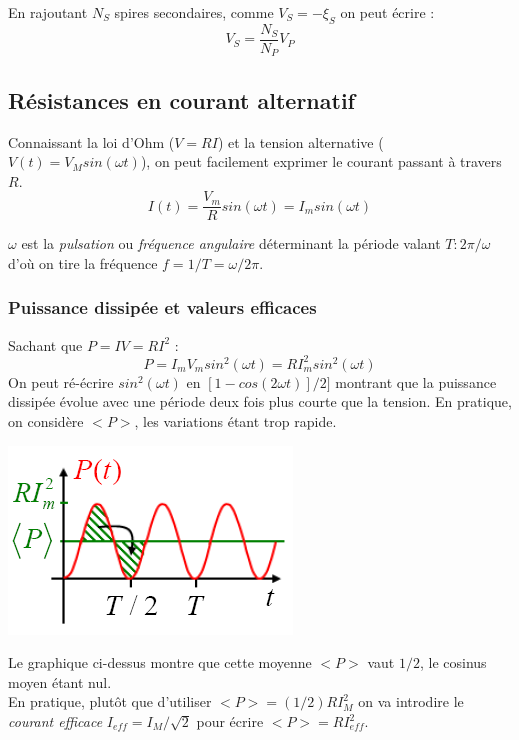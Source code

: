 \documentclass	[11pt, a4paper, openany]{book}
\begin{document}
En rajoutant $N_S$ spires secondaires, comme $V_S = - \xi_S$ on peut écrire :
\begin{equation}
	V_S = \frac{N_S}{N_P}V_P
\end{equation}

\subsection{Résistances en courant alternatif}
Connaissant la loi d'Ohm ($V = RI$) et la tension alternative ($V(t) = V_M sin(\omega t)$), on peut facilement exprimer le courant passant à travers $R$.
\begin{equation}
	I(t) = \frac{V_m}{R} sin(\omega t) = I_m sin(\omega t)
\end{equation}

$\omega$ est la \textit{pulsation} ou \textit{fréquence angulaire} déterminant la période valant $T : 2\pi /\omega$ d'où on tire la fréquence $f = 1/T = \omega / 2\pi$.

\subsubsection{Puissance dissipée et valeurs efficaces}
Sachant que $P = IV = RI^2$ :
\begin{equation}
	P = I_mV_m sin^2(\omega t) = RI_m^2 sin^2(\omega t)
\end{equation}
On peut ré-écrire $sin^2(\omega t)$ en $[1-cos(2\omega t)]/2]$ montrant que la puissance dissipée évolue avec une période deux fois plus courte que la tension. En pratique, on considère $<P>$, les variations étant trop rapide.
	\begin{center}
		\includegraphics[scale=0.45]{em/image26.png}\\
	\end{center}
	Le graphique ci-dessus montre que cette moyenne $<P>$ vaut $1/2$, le cosinus moyen étant nul.\\
	En pratique, plutôt que d'utiliser $<P> = (1/2)RI^2_M$  on va introdire le \textit{courant efficace} $I_{eff} = I_M/\sqrt{2}$ pour écrire $<P> = RI_{eff}^2$.\\
	
\end{document}
